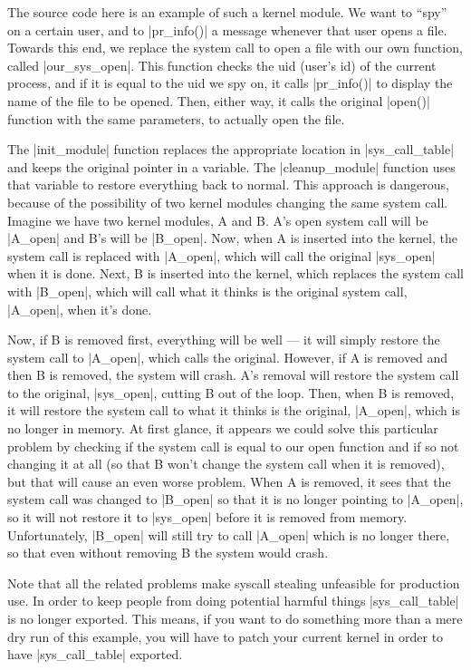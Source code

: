 \documentclass[10pt, oneside]{book}
\begin{document}
The source code here is an example of such a kernel module.
We want to ``spy'' on a certain user, and to \cpp|pr_info()| a message whenever that user opens a file.
Towards this end, we replace the system call to open a file with our own function, called \cpp|our_sys_open|.
This function checks the uid (user's id) of the current process, and if it is equal to the uid we spy on, it calls \cpp|pr_info()| to display the name of the file to be opened.
Then, either way, it calls the original \cpp|open()| function with the same parameters, to actually open the file.

The \cpp|init_module| function replaces the appropriate location in \cpp|sys_call_table| and keeps the original pointer in a variable.
The \cpp|cleanup_module| function uses that variable to restore everything back to normal.
This approach is dangerous, because of the possibility of two kernel modules changing the same system call.
Imagine we have two kernel modules, A and B. A's open system call will be \cpp|A_open| and B's will be \cpp|B_open|.
Now, when A is inserted into the kernel, the system call is replaced with \cpp|A_open|, which will call the original \cpp|sys_open| when it is done.
Next, B is inserted into the kernel, which replaces the system call with \cpp|B_open|, which will call what it thinks is the original system call, \cpp|A_open|, when it's done.

Now, if B is removed first, everything will be well --- it will simply restore the system call to \cpp|A_open|, which calls the original.
However, if A is removed and then B is removed, the system will crash.
A's removal will restore the system call to the original, \cpp|sys_open|, cutting B out of the loop.
Then, when B is removed, it will restore the system call to what it thinks is the original, \cpp|A_open|, which is no longer in memory.
At first glance, it appears we could solve this particular problem by checking if the system call is equal to our open function and if so not changing it at all (so that B won't change the system call when it is removed), but that will cause an even worse problem.
When A is removed, it sees that the system call was changed to \cpp|B_open| so that it is no longer pointing to \cpp|A_open|, so it will not restore it to \cpp|sys_open| before it is removed from memory.
Unfortunately, \cpp|B_open| will still try to call \cpp|A_open| which is no longer there, so that even without removing B the system would crash.

Note that all the related problems make syscall stealing unfeasible for production use.
In order to keep people from doing potential harmful things \cpp|sys_call_table| is no longer exported.
This means, if you want to do something more than a mere dry run of this example, you will have to patch your current kernel in order to have \cpp|sys_call_table| exported.
\end{document}
